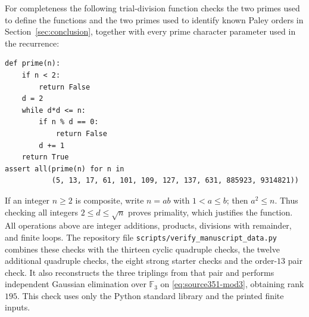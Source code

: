 \documentclass[10pt]{article}
\newcommand{\F}{\mathbb F}
\begin{document}
For completeness the following trial-division function checks the two
primes used to define the functions and the two primes used to identify
known Paley orders in Section~\ref{sec:conclusion}, together with every
prime character parameter used in the recurrence:
\begin{verbatim}
def prime(n):
    if n < 2:
        return False
    d = 2
    while d*d <= n:
        if n % d == 0:
            return False
        d += 1
    return True
assert all(prime(n) for n in
           (5, 13, 17, 61, 101, 109, 127, 137, 631, 885923, 9314821))
\end{verbatim}
If an integer $n\geq2$ is composite, write $n=ab$ with $1<a\leq b$;
then $a^2\leq n$. Thus checking all integers $2\leq d\leq\sqrt n$
proves primality, which justifies the function. All operations above are
integer additions, products, divisions with remainder, and finite loops.
The repository file \texttt{scripts/verify\_manuscript\_data.py} combines these checks
with the thirteen cyclic quadruple checks, the twelve additional quadruple
checks, the eight strong starter checks and the order-$13$ pair check.
It also reconstructs the three triplings from that pair and performs
independent Gaussian elimination over $\F_3$ on
\eqref{eq:source351-mod3}, obtaining rank $195$. This check uses only
the Python standard library and the printed finite inputs.
\end{document}
